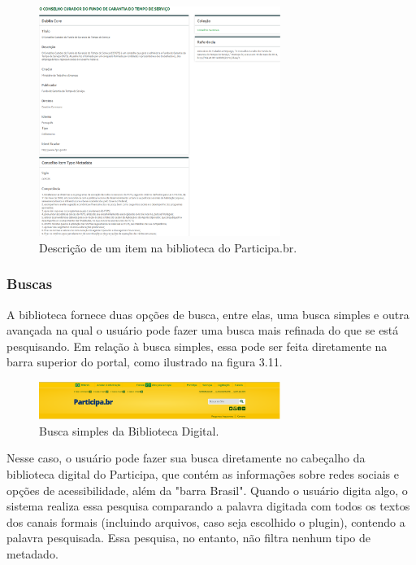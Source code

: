 \graphicspath{{figuras/prototipo/}}
\begin{figure}[H]
\centering
\includegraphics[width=0.7\textwidth]{descricao-item}
\caption{Descrição de um item na biblioteca do Participa.br.}
\label{fig:descricao_prototipo}
\end{figure}

\subsubsection{Buscas}

A biblioteca fornece duas opções de busca, entre elas, uma busca simples e outra avançada na qual o usuário pode fazer uma busca mais refinada do que se está pesquisando.
Em relação à busca simples, essa pode ser feita diretamente na barra superior do portal, como ilustrado na figura 3.11.

\graphicspath{{figuras/prototipo/}}
\begin{figure}[H]
\centering
\includegraphics[width=0.7\textwidth]{cabecalho}
\caption{Busca simples da Biblioteca Digital.}
\label{fig:buscasimples_prototipo}
\end{figure}

Nesse caso, o usuário pode fazer sua busca diretamente no cabeçalho da biblioteca digital do Participa, que contém as informações sobre redes sociais e opções de acessibilidade, além da "barra Brasil". Quando o usuário digita algo, o sistema realiza essa pesquisa comparando a palavra digitada com todos os textos dos canais formais (incluindo arquivos, caso seja escolhido o plugin), contendo a palavra pesquisada. Essa pesquisa, no entanto, não filtra nenhum tipo de metadado. 

